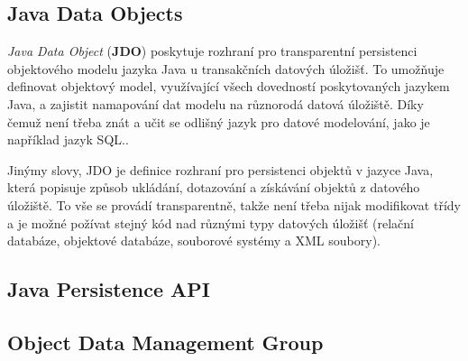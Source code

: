 \subsection{Java Data Objects}
\emph{Java Data Object} (\textbf{JDO}) poskytuje rozhraní pro transparentní persistenci objektového modelu jazyka Java u transakčních datových úložišť. To umožňuje definovat objektový model, využívající všech dovedností poskytovaných jazykem Java, a zajistit namapování dat modelu na různorodá datová úložiště. Díky čemuž není třeba znát a učit se odlišný jazyk pro datové modelování, jako je například jazyk SQL.\cite{jordan:jdo}.

Jinýmy slovy, JDO je definice rozhraní pro persistenci objektů v jazyce Java, která popisuje způsob ukládání, dotazování a získávání objektů z datového úložiště. To vše se provádí transparentně, takže není třeba nijak modifikovat třídy a je možné požívat stejný kód nad různými typy datových úložišť (relační databáze, objektové databáze, souborové systémy a XML soubory)\cite{roos:jdo}.
\cite{tyagi:cjdo,ezzio:uujdo}
\subsection{Java Persistence API}
\cite{jpa:spec}
\subsection{Object Data Management Group}
\cite{odmg}
